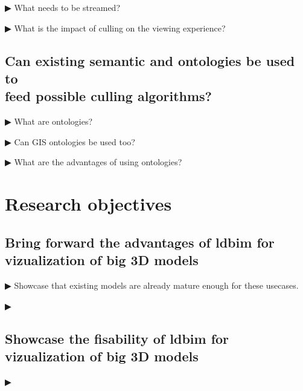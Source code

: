 ▶ What needs to be streamed?

▶ What is the impact of culling on the viewing experience?

\subsection[Can existing semantic be used?]{Can existing semantic and ontologies be used to\\
    feed possible culling algorithms?}
▶ What are ontologies?

▶ Can GIS ontologies be used too?

▶ What are the advantages of using ontologies?

\section{Research objectives}
\subsection[Advantages of LDBIM]{Bring forward the advantages of \acs{ldbim} for vizualization of big 3D models}
▶ Showcase that existing models are already mature enough for these usecases.

▶ 
\subsection[Showcase the fisability]{Showcase the fisability of \acs{ldbim} for vizualization of big 3D models}
▶ 